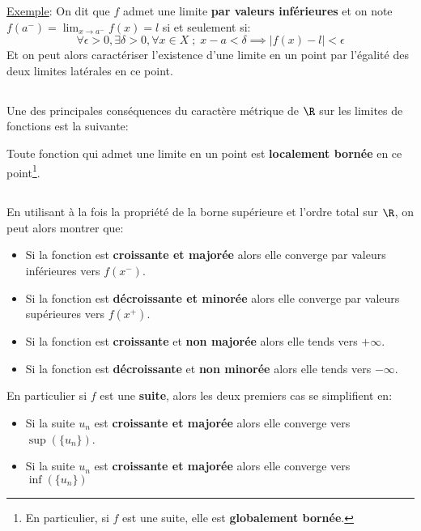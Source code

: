 \uline{Exemple}: On dit que \(f\) admet une limite \textbf{par valeurs inférieures} et on note \(f(a^-) = \lim_{x \rightarrow a^-} f(x) = l\) si et seulement si:
\[
   \forall \epsilon > 0 , \exists \delta > 0 , \forall x \in X \; ; \; x - a < \delta \implies |f(x) - l| < \epsilon
\]
Et on peut alors caractériser l'existence d'une limite en un point par l'égalité des deux limites latérales en ce point.
\subsection*{}
Une des principales conséquences du caractère métrique de \(\R\) sur les limites de fonctions est la suivante:
\begin{center}
   Toute fonction qui admet une limite en un point est \textbf{localement bornée} en ce point\footnote[1]{En particulier, si \(f\) est une suite, elle est \textbf{globalement bornée}.}.
\end{center}
\subsection*{}
En utilisant à la fois la propriété de la borne supérieure et l'ordre total sur \(\R\), on peut alors montrer que:
\begin{itemize}
   \item  Si la fonction est \textbf{croissante et majorée} alors elle converge par valeurs inférieures vers \(f(x^-)\).
   \item  Si la fonction est \textbf{décroissante et minorée} alors elle converge par valeurs supérieures vers \(f(x^+)\).
   \item  Si la fonction est \textbf{croissante} et \textbf{non majorée} alors elle tends vers \(+ \infty\).
   \item  Si la fonction est \textbf{décroissante} et \textbf{non minorée} alors elle tends vers \(- \infty\).
\end{itemize}
En particulier si \(f\) est une \textbf{suite}, alors les deux premiers cas se simplifient en:
\begin{itemize}
   \item Si la suite \(u_n\) est \textbf{croissante et majorée} alors elle converge vers \(\sup(\{u_n\})\).
   \item Si la suite \(u_n\) est \textbf{croissante et majorée} alors elle converge vers \(\inf(\{u_n\})\)
\end{itemize}
\pagebreak
